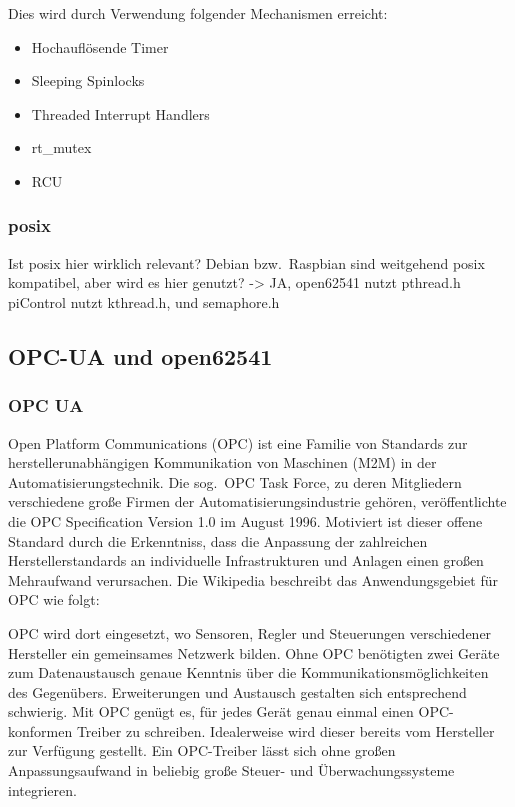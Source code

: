 Dies wird durch Verwendung folgender Mechanismen erreicht:

\begin{itemize}
  \item Hochauflösende Timer
  \item Sleeping Spinlocks
  \item Threaded Interrupt Handlers
  \item rt\_mutex
  \item RCU
\end{itemize}


\subsubsection{posix%
        \label{sec:2-posix}}
Ist posix hier wirklich relevant? Debian bzw.~Raspbian sind weitgehend posix
kompatibel, aber wird es hier genutzt? -> JA, open62541 nutzt pthread.h
piControl nutzt kthread.h, und semaphore.h

\subsection{OPC-UA und open62541%
     \label{sec:2-opc}}

\subsubsection{OPC UA%
        \label{sec:2-opcua}}
Open Platform Communications (OPC) ist eine Familie von Standards zur herstellerunabhängigen
Kommunikation von Maschinen (M2M) in der Automatisierungstechnik. Die sog.~OPC Task Force, zu deren
Mitgliedern verschiedene große Firmen der Automatisierungsindustrie gehören, veröffentlichte
die OPC Specification Version 1.0 im August 1996.
Motiviert ist dieser offene Standard durch die Erkenntniss, dass die Anpassung der
zahlreichen Herstellerstandards an individuelle Infrastrukturen und Anlagen einen
großen Mehraufwand verursachen.
Die Wikipedia beschreibt das Anwendungsgebiet für OPC wie folgt:

\glqq{}OPC wird dort eingesetzt, wo Sensoren, Regler und Steuerungen verschiedener Hersteller
ein gemeinsames Netzwerk bilden. Ohne OPC benötigten zwei Geräte zum Datenaustausch
genaue Kenntnis über die Kommunikationsmöglichkeiten des Gegenübers. Erweiterungen
und Austausch gestalten sich entsprechend schwierig. Mit OPC genügt es, für jedes
Gerät genau einmal einen OPC-konformen Treiber zu schreiben. Idealerweise wird
dieser bereits vom Hersteller zur Verfügung gestellt. Ein OPC-Treiber lässt sich
ohne großen Anpassungsaufwand in beliebig große Steuer- und Überwachungssysteme
integrieren.

